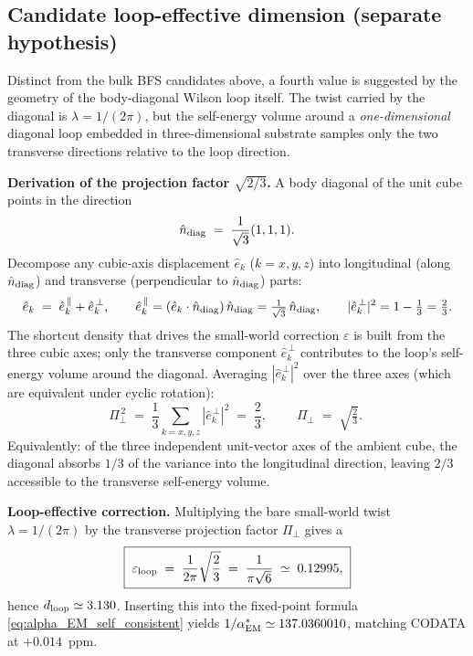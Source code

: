 \documentclass[11pt,a4paper]{article}
\begin{document}
\subsection{Candidate loop-effective dimension (separate hypothesis)}
\label{sec:loop-eff}

Distinct from the bulk BFS candidates above, a fourth value is
suggested by the geometry of the body-diagonal Wilson loop
itself. The twist carried by the diagonal is
$\lambda = 1/(2\pi)$, but the self-energy volume around a
\emph{one-dimensional} diagonal loop embedded in
three-dimensional substrate samples only the two transverse
directions relative to the loop direction.

\textbf{Derivation of the projection factor $\sqrt{2/3}$.} A
body diagonal of the unit cube points in the direction
\begin{equation*}
\hat{n}_{\rm diag} \;=\; \frac{1}{\sqrt{3}}(1,1,1).
\end{equation*}
Decompose any cubic-axis displacement $\hat{e}_k$ ($k = x, y, z$)
into longitudinal (along $\hat{n}_{\rm diag}$) and transverse
(perpendicular to $\hat{n}_{\rm diag}$) parts:
\begin{equation*}
\hat{e}_k \;=\; \hat{e}_k^{\,\parallel} + \hat{e}_k^{\,\perp},
\qquad
\hat{e}_k^{\,\parallel} = (\hat{e}_k \cdot \hat{n}_{\rm diag})
\,\hat{n}_{\rm diag}
= \tfrac{1}{\sqrt{3}}\,\hat{n}_{\rm diag},
\qquad
|\hat{e}_k^{\,\perp}|^2 = 1 - \tfrac{1}{3} = \tfrac{2}{3}.
\end{equation*}
The shortcut density that drives the small-world correction
$\varepsilon$ is built from the three cubic axes; only the
transverse component $\hat{e}_k^{\,\perp}$ contributes to the
loop's self-energy volume around the diagonal. Averaging
$|\hat{e}_k^{\,\perp}|^2$ over the three axes (which are
equivalent under cyclic rotation):
\begin{equation*}
\Pi_\perp^{\,2}
\;=\; \frac{1}{3}\sum_{k=x,y,z} |\hat{e}_k^{\,\perp}|^2
\;=\; \frac{2}{3},
\qquad
\boxed{\;\Pi_\perp \;=\; \sqrt{\tfrac{2}{3}}.\;}
\end{equation*}
Equivalently: of the three independent unit-vector axes of the
ambient cube, the diagonal absorbs $1/3$ of the variance into the
longitudinal direction, leaving $2/3$ accessible to the transverse
self-energy volume.

\textbf{Loop-effective correction.} Multiplying the bare
small-world twist $\lambda = 1/(2\pi)$ by the transverse
projection factor $\Pi_\perp$ gives a
\begin{equation}
\boxed{\;
\varepsilon_{\rm loop}
\;=\; \frac{1}{2\pi}\sqrt{\frac{2}{3}}
\;=\; \frac{1}{\pi\sqrt{6}}
\;\simeq\; 0.12995,
\;}
\label{eq:eps-loop}
\end{equation}
hence $d_{\rm loop} \simeq 3.130$. Inserting this into the
fixed-point formula \eqref{eq:alpha_EM_self_consistent} yields
$1/\alpha_{\rm EM}^* \simeq 137.0360010$, matching CODATA at
$+0.014$~ppm.
\end{document}

